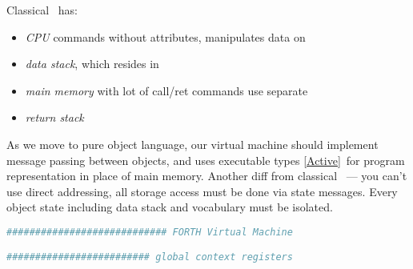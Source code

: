 \label{FVM}\secdown

Classical \F\ has:
\begin{itemize}[nosep]
  \item \emph{CPU} commands without attributes, manipulates data on
  \item \emph{data stack}, which resides in
  \item \emph{main memory} with lot of call/ret commands use separate
  \item \emph{return stack}
\end{itemize}

\noindent
As we move to pure object language, our virtual machine should implement message
passing between objects, and uses executable types \ref{Active}\ for program
representation in place of main memory. Another diff from classical \F\ --- you
can't use direct addressing, all storage access must be done via state messages.
Every object state including data stack and vocabulary must be isolated.

\begin{lstlisting}[language=Python]
############################ FORTH Virtual Machine

######################### global context registers
\end{lstlisting}

\secup
